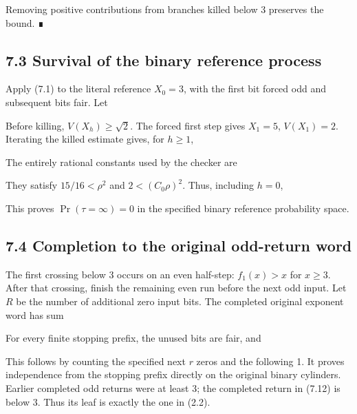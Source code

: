 
Removing positive contributions from branches killed below 3 preserves
the bound. ∎

\subsection{7.3 Survival of the binary reference process}

Apply (7.1) to the literal reference \(X_0=3\), with the first bit
forced odd and subsequent bits fair. Let


Before killing, \(V(X_h)\ge\sqrt2\). The forced first step gives
\(X_1=5\), \(V(X_1)=2\). Iterating the killed estimate gives, for
\(h\ge1\),


The entirely rational constants used by the checker are


They satisfy \(15/16<\rho^2\) and \(2<(C_0\rho)^2\). Thus, including
\(h=0\),


This proves \(\Pr(\tau=\infty)=0\) in the specified binary reference
probability space.

\subsection{7.4 Completion to the original odd-return word}

The first crossing below 3 occurs on an even half-step: \(f_1(x)>x\) for
\(x\ge3\). After that crossing, finish the remaining even run before the
next odd input. Let \(R\) be the number of additional zero input bits.
The completed original exponent word has sum


For every finite stopping prefix, the unused bits are fair, and


This follows by counting the specified next \(r\) zeros and the
following 1. It proves independence from the stopping prefix directly on
the original binary cylinders. Earlier completed odd returns were at
least 3; the completed return in (7.12) is below 3. Thus its leaf is
exactly the one in (2.2).


